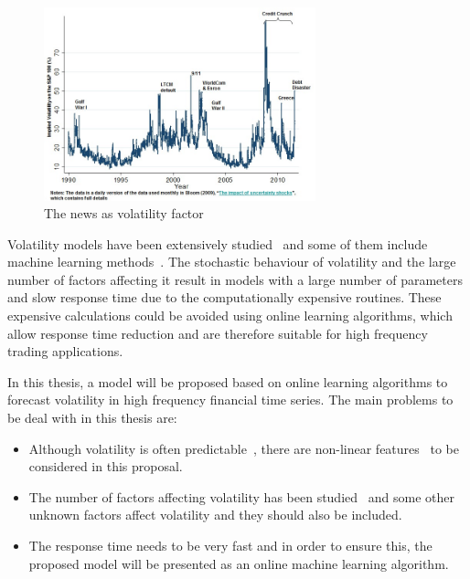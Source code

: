 \begin{figure}[h]
 \centering
 \includegraphics[width=0.7\textwidth]{img/vol-factor-thenews.jpg}
 \caption{The news as volatility factor}
 \label{fig:VolFactorNews}
\end{figure}


Volatility models have been extensively studied~\cite{gatheral2006,poon+granger2003,knight2002} and some of  them include machine learning methods~\cite{hamidetal2004,donaldsonetal1997,shiyietal2008,shiyietal2010,gavrishchaka2006,vasilios2012}.  
The stochastic behaviour of volatility and the large number of factors affecting it result in models with a large number of parameters and slow response time due to the computationally expensive routines. These expensive calculations could be avoided using online learning algorithms, which allow response time reduction and are therefore suitable for high frequency trading applications. 

In this thesis, a model will be proposed based on online learning algorithms to forecast volatility in high frequency financial time series.
The main problems to be deal with in this thesis are:

\begin{itemize}
   \item Although volatility is often predictable~\cite{poon+granger2003}, there are non-linear features~\cite{gatheral2006} to be considered in this proposal.
    \item The number of factors affecting volatility has been studied~\cite{srinivasan2009} and some other unknown factors affect volatility and they should also be included.
    \item The response time needs to be very fast and in order to ensure this, the proposed model will be presented as an online machine learning algorithm. 
\end{itemize}





